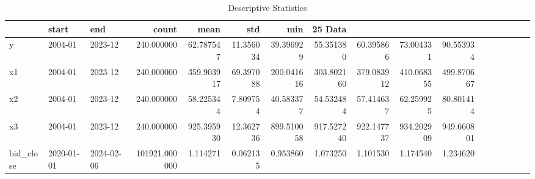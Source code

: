 \begin{table}
\caption{Descriptive Statistics}
\begin{tabular}{lllrrrrrrrr}
\toprule
 & start & end & count & mean & std & min & 25%
Data &  &  &  &  &  &  &  &  &  &  \\
\midrule
y & 2004-01 & 2023-12 & 240.000000 & 62.787547 & 11.356034 & 39.396929 & 55.351380 & 60.395866 & 73.004331 & 90.553934 \\
x1 & 2004-01 & 2023-12 & 240.000000 & 359.903917 & 69.397088 & 200.041616 & 303.802160 & 379.083912 & 410.068355 & 499.870667 \\
x2 & 2004-01 & 2023-12 & 240.000000 & 58.225344 & 7.809754 & 40.583377 & 54.532484 & 57.414637 & 62.259925 & 80.801414 \\
x3 & 2004-01 & 2023-12 & 240.000000 & 925.395930 & 12.362736 & 899.510058 & 917.527240 & 922.147737 & 934.202909 & 949.660801 \\
bid_close & 2020-01-01 & 2024-02-06 & 101921.000000 & 1.114271 & 0.062135 & 0.953860 & 1.073250 & 1.101530 & 1.174540 & 1.234620 \\
\bottomrule
\end{tabular}
\end{table}
